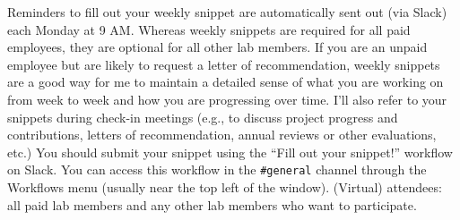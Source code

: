 \documentclass{tufte-book} %
\begin{document}
\begin{enumerate}
Reminders to fill out your weekly snippet are automatically sent out (via
Slack) each Monday at 9 AM. Whereas weekly snippets are required for all paid
employees, they are optional for all other lab members. If you are an unpaid
employee but are likely to request a letter of recommendation, weekly snippets
are a good way for me to maintain a detailed sense of what you are working on
from week to week and how you are progressing over time. I'll also refer to
your snippets during check-in meetings (e.g., to discuss project progress and
contributions, letters of recommendation, annual reviews or other evaluations,
etc.) You should submit your snippet using the ``Fill out your snippet!''
workflow on Slack. You can access this workflow in the \texttt{\#general}
channel through the Workflows menu (usually near the top left of the window).
(Virtual) attendees: all paid lab members and any other lab members who want to
participate. 
\end{enumerate}

{}
\end{document}
